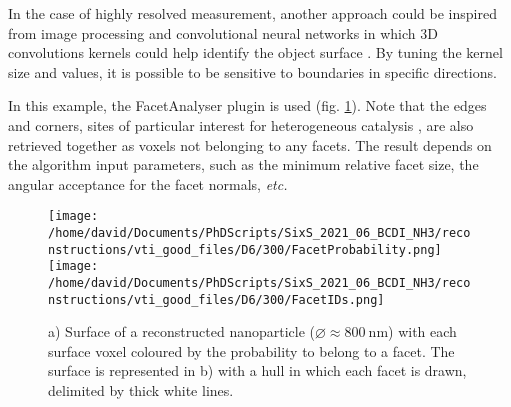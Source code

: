 In the case of highly resolved measurement, another approach could be inspired from  image processing and convolutional neural networks in which 3D convolutions kernels could help identify the object surface \parencite{RaschkaMirjalili2019}.
By tuning the kernel size and values, it is possible to be sensitive to boundaries in specific directions.

In this example, the FacetAnalyser plugin is used (fig. \ref{fig:FacetsParaview}). Note that the edges and corners, sites of particular interest for heterogeneous catalysis \parencite{Taylor1925}, are also retrieved together as voxels not belonging to any facets.
The result depends on the algorithm input parameters, such as the minimum relative facet size, the angular acceptance for the facet normals, \textit{etc.}

\begin{figure}
    \centering
    \texttt{[image: /home/david/Documents/PhDScripts/SixS\_2021\_06\_BCDI\_NH3/reconstructions/vti\_good\_files/D6/300/FacetProbability.png]}
    \texttt{[image: /home/david/Documents/PhDScripts/SixS\_2021\_06\_BCDI\_NH3/reconstructions/vti\_good\_files/D6/300/FacetIDs.png]}
    \caption{
    a) Surface of a reconstructed nanoparticle ($\diameter \approx \qty{800}{\nm}$) with each surface voxel coloured by the probability to belong to a facet.
    The surface is represented in b) with a hull in which each facet is drawn, delimited by thick white lines.
    }
    \label{fig:FacetsParaview}
\end{figure}

\begin{table}
    \begin{center}
    \end{center}
    \caption{
    The output of  is a list of values for each facet.
    The accessible features are the facet size, the average strain and displacement (along the [111] direction), and the coordinates of the normal to the facet surface..
    The uncertainty on the average displacement and strain corresponds to the standard deviation of the displacement and strain distribution, respectively.
    }
    \label{tab:facets}
\end{table}{}
